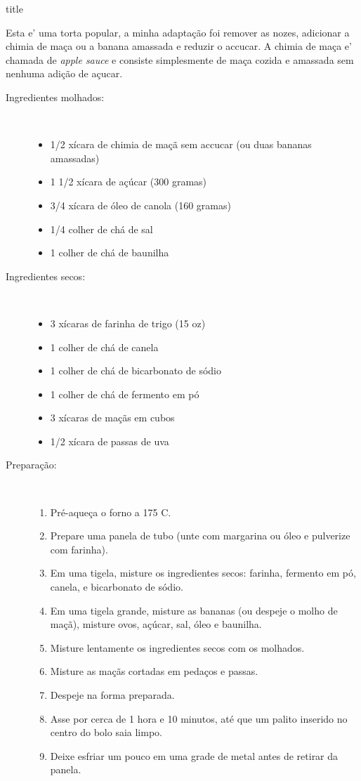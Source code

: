 \documentclass [11pt, letterpaper] {article}
\begin{document}
 {title}

Esta e' uma torta popular, a minha adapta\c{c}\~ao foi remover as nozes, adicionar a chimia de ma\c{c}a ou a banana amassada e reduzir o a{c}cucar. A chimia de ma\c{c}a e' chamada de {\it apple sauce} e consiste simplesmente de ma\c{c}a cozida e amassada sem nenhuma adi\c{c}\~ao de a\c{c}ucar.

\begin {description}
\item [Ingredientes molhados:] \ \newline
\begin {itemize}
\item 1/2 xícara de chimia de maçã sem ac{c}ucar (ou duas bananas amassadas)
\item 1 1/2 xícara de açúcar (300 gramas)
\item 3/4 xícara de óleo de canola (160 gramas)
\item 1/4 colher de chá de sal
\item 1 colher de chá de baunilha
\end {itemize}

\item [Ingredientes secos:] \ \newline
\begin {itemize}
\item 3 xícaras de farinha de trigo (15 oz)
\item 1 colher de chá de canela 
\item 1 colher de chá de bicarbonato de sódio
\item 1 colher de chá de fermento em pó
\item 3 xícaras de maçãs em cubos
\item 1/2 xícara de passas de uva
\end {itemize}

\item [Preparação:] \ \newline
\begin {enumerate}
\item Pré-aqueça o forno a 175 C.
\item Prepare uma panela de tubo (unte com margarina ou \'oleo e pulverize com farinha).
\item Em uma tigela, misture os ingredientes secos: farinha, fermento em p\'o, canela,
e bicarbonato de sódio.
\item Em uma tigela grande, misture as bananas (ou despeje o molho de maçã), misture ovos,
açúcar, sal, óleo e baunilha.
\item Misture lentamente os ingredientes secos com os molhados.
\item Misture as maçãs cortadas em pedaços e passas.
\item Despeje na forma preparada.
\item Asse por cerca de 1 hora e 10 minutos, até que um palito inserido
no centro do bolo saia limpo.
\item Deixe esfriar um pouco em uma grade de metal antes de retirar da panela.
\end {enumerate}
\end {description}
\end{document}
